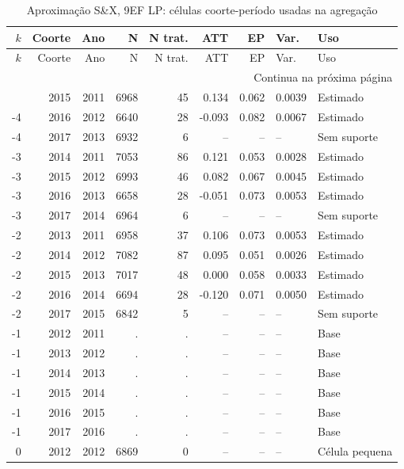 \begingroup
\tiny
\setlength{\tabcolsep}{2.2pt}
\renewcommand{\arraystretch}{0.82}
\begin{longtable}{rrrrrrrll}
\caption{Aproximação S\&X, 9EF LP: células coorte-período usadas na agregação}
\label{tab:ap_sx_celulas_9ef_lp}\\
\toprule
\(k\) & Coorte & Ano & N & N trat. & ATT & EP & Var. & Uso \\
\midrule
\endfirsthead
\toprule
\(k\) & Coorte & Ano & N & N trat. & ATT & EP & Var. & Uso \\
\midrule
\endhead
\midrule
\multicolumn{9}{r}{Continua na próxima página} \\
\endfoot
\bottomrule
\endlastfoot
-4 & 2015 & 2011 & 6968 & 45 & 0.134 & 0.062 & 0.0039 & Estimado \\
-4 & 2016 & 2012 & 6640 & 28 & -0.093 & 0.082 & 0.0067 & Estimado \\
-4 & 2017 & 2013 & 6932 & 6 & -- & -- & -- & Sem suporte \\
-3 & 2014 & 2011 & 7053 & 86 & 0.121 & 0.053 & 0.0028 & Estimado \\
-3 & 2015 & 2012 & 6993 & 46 & 0.082 & 0.067 & 0.0045 & Estimado \\
-3 & 2016 & 2013 & 6658 & 28 & -0.051 & 0.073 & 0.0053 & Estimado \\
-3 & 2017 & 2014 & 6964 & 6 & -- & -- & -- & Sem suporte \\
-2 & 2013 & 2011 & 6958 & 37 & 0.106 & 0.073 & 0.0053 & Estimado \\
-2 & 2014 & 2012 & 7082 & 87 & 0.095 & 0.051 & 0.0026 & Estimado \\
-2 & 2015 & 2013 & 7017 & 48 & 0.000 & 0.058 & 0.0033 & Estimado \\
-2 & 2016 & 2014 & 6694 & 28 & -0.120 & 0.071 & 0.0050 & Estimado \\
-2 & 2017 & 2015 & 6842 & 5 & -- & -- & -- & Sem suporte \\
-1 & 2012 & 2011 & . & . & -- & -- & -- & Base \\
-1 & 2013 & 2012 & . & . & -- & -- & -- & Base \\
-1 & 2014 & 2013 & . & . & -- & -- & -- & Base \\
-1 & 2015 & 2014 & . & . & -- & -- & -- & Base \\
-1 & 2016 & 2015 & . & . & -- & -- & -- & Base \\
-1 & 2017 & 2016 & . & . & -- & -- & -- & Base \\
0 & 2012 & 2012 & 6869 & 0 & -- & -- & -- & Célula pequena \\

\end{longtable}
